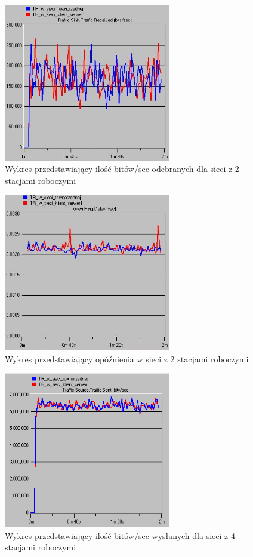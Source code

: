 \documentclass{article}
\begin{document}
\begin{figure}[H]
  \centering
  \includegraphics[width=0.65\textwidth]{screens/2_recv.png}
 \caption{Wykres przedstawiający ilość bitów/sec odebranych dla sieci z 2 stacjami roboczymi}
 \label{fig:2r}
\end{figure}

\begin{figure}[H]
  \centering
  \includegraphics[width=0.65\textwidth]{screens/2_delay.png}
 \caption{Wykres przedstawiający opóźnienia w sieci z 2 stacjami roboczymi}
 \label{fig:2d}
\end{figure}

\begin{figure}[H]
  \centering
  \includegraphics[width=0.65\textwidth]{screens/4_sent.png}
 \caption{Wykres przedstawiający ilość bitów/sec wysłanych dla sieci z 4 stacjami roboczymi}
 \label{fig:4s}
\end{figure}
\end{document}
